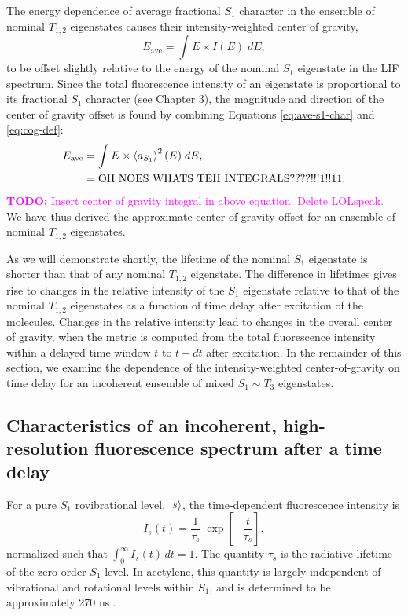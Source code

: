 \documentclass[12pt]{mitthesis}
\newcommand{\TODO} [1]{\textcolor{magenta}{\textbf{TODO:} #1}}
\begin{document}
The energy dependence of average fractional $S_1$ character in the
ensemble of nominal $T_{1,2}$ eigenstates causes their
intensity-weighted center of gravity,
\begin{equation}
  \label{eq:cog-def}
  E_{\text{ave}} = \int E \times I(E) \; dE,
\end{equation}
to be offset slightly relative to the energy of the nominal $S_1$
eigenstate in the LIF spectrum.  Since the total fluorescence
intensity of an eigenstate is proportional to its fractional $S_1$
character (see Chapter 3), the magnitude and direction of the center
of gravity offset is found by combining Equations \ref{eq:ave-s1-char}
and \ref{eq:cog-def}:
\begin{equation}
  \begin{split}
    E_{\text{ave}} 
    &= \int E \times \mathinner{\langle{a_{S_1}}\rangle}^2(E) \; dE,\\
    &= \text{OH NOES WHATS TEH INTEGRALS????!!!1!!11}.
  \end{split}
\end{equation}
\TODO{Insert center of gravity integral in above equation. Delete
  LOLspeak.}  We have thus derived the approximate center of gravity
offset for an ensemble of nominal $T_{1,2}$ eigenstates.

As we will demonstrate shortly, the lifetime of the nominal $S_1$
eigenstate is shorter than that of any nominal $T_{1,2}$ eigenstate.
The difference in lifetimes gives rise to changes in the relative
intensity of the $S_1$ eigenstate relative to that of the nominal
$T_{1,2}$ eigenstates as a function of time delay after excitation of
the molecules.  Changes in the relative intensity lead to changes in
the overall center of gravity, when the metric is computed from the
total fluorescence intensity within a delayed time window $t$ to
$t+dt$ after excitation.  In the remainder of this section, we examine
the dependence of the intensity-weighted center-of-gravity on time
delay for an incoherent ensemble of mixed $S_1 \sim T_3$ eigenstates.





\subsection{Characteristics of an incoherent, high-resolution
  fluorescence spectrum after a time delay}

For a pure $S_1$ rovibrational level, $\mathinner{|{s}\rangle}$, the time-dependent
fluorescence intensity is
\begin{equation}
  I_s(t) = \frac{1}{\tau_s} \;
           \exp \left[
             -\frac{t}{ \tau_s} 
           \right],
\end{equation}
normalized such that $\int_0^{\infty} I_s(t) \, dt = 1$.  The quantity
$\tau_s$ is the radiative lifetime of the zero-order $S_1$ level.  In
acetylene, this quantity is largely independent of vibrational and
rotational levels within $S_1$, and is determined to be approximately
270 ns \cite{ochi91, stephenson84}.
\end{document}
